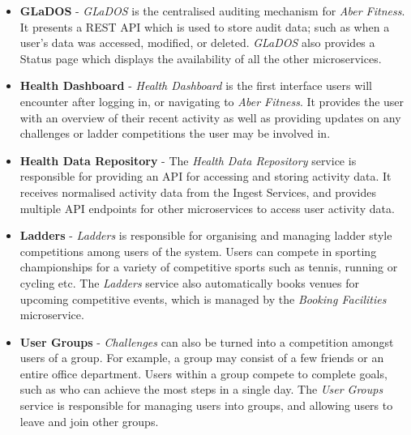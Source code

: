 \begin{itemize}
	\item \textbf{GLaDOS} - \textit{GLaDOS} is the centralised auditing mechanism for \textit{Aber Fitness}. It presents a REST API which is used to store audit data; such as when a user's data was accessed, modified, or deleted. \textit{GLaDOS} also provides a Status page which displays the availability of all the other microservices.

	\item \textbf{Health Dashboard} - \textit{Health Dashboard} is the first interface users will encounter after logging in, or navigating to \textit{Aber Fitness}.  It provides the user with an overview of their recent activity as well as providing updates on any challenges or ladder competitions the user may be involved in.

	\item \textbf{Health Data Repository} - The \textit{Health Data Repository} service is responsible for providing an API for accessing and storing activity data. It receives normalised activity data from the Ingest Services, and provides multiple API endpoints for other microservices to access user activity data. 

	\item \textbf{Ladders} - \textit{Ladders} is responsible for organising and managing ladder style competitions among users of the system. Users can compete in sporting championships for a variety of competitive sports such as tennis, running or cycling etc. The \textit{Ladders} service also automatically books venues for upcoming competitive events, which is managed by the \textit{Booking Facilities} microservice.

	\item \textbf{User Groups} - \textit{Challenges} can also be turned into a competition amongst users of a group. For example, a group may consist of a few friends or an entire office department. Users within a group compete to complete goals, such as who can achieve the most steps in a single day. The \textit{User Groups} service is responsible for managing users into groups, and allowing users to leave and join other groups.

\end{itemize}
